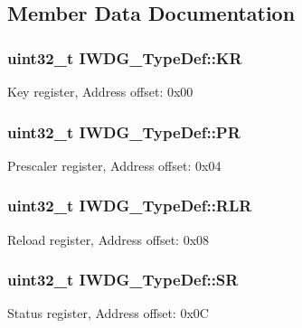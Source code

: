 \subsection{Member Data Documentation}
\hypertarget{struct_i_w_d_g___type_def_a63089aaa5f4ad34ee2677ebcdee49cd9}{
\subsubsection[{K\-R}]{ uint32\-\_\-t I\-W\-D\-G\-\_\-\-Type\-Def\-::\-K\-R}}\label{struct_i_w_d_g___type_def_a63089aaa5f4ad34ee2677ebcdee49cd9}
Key register, Address offset\-: 0x00 \hypertarget{struct_i_w_d_g___type_def_a5f2717885ff171e686e0347af9e6b68d}{
\subsubsection[{P\-R}]{ uint32\-\_\-t I\-W\-D\-G\-\_\-\-Type\-Def\-::\-P\-R}}\label{struct_i_w_d_g___type_def_a5f2717885ff171e686e0347af9e6b68d}
Prescaler register, Address offset\-: 0x04 \hypertarget{struct_i_w_d_g___type_def_aa3703eaa40e447dcacc69c0827595532}{
\subsubsection[{R\-L\-R}]{ uint32\-\_\-t I\-W\-D\-G\-\_\-\-Type\-Def\-::\-R\-L\-R}}\label{struct_i_w_d_g___type_def_aa3703eaa40e447dcacc69c0827595532}
Reload register, Address offset\-: 0x08 \hypertarget{struct_i_w_d_g___type_def_a9bbfbe921f2acfaf58251849bd0a511c}{
\subsubsection[{S\-R}]{ uint32\-\_\-t I\-W\-D\-G\-\_\-\-Type\-Def\-::\-S\-R}}\label{struct_i_w_d_g___type_def_a9bbfbe921f2acfaf58251849bd0a511c}
Status register, Address offset\-: 0x0\-C 

